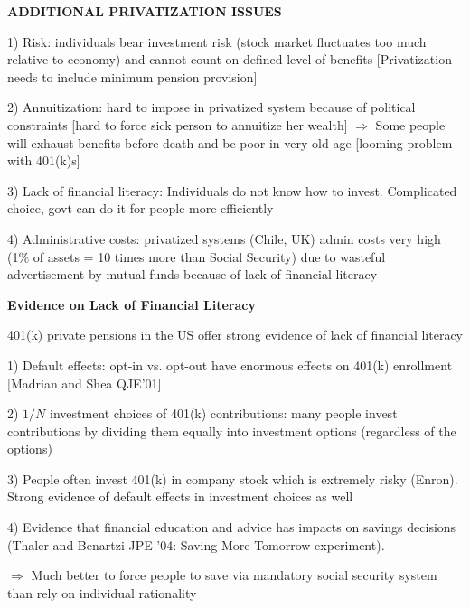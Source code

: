 \documentclass[landscape]{slides}
\begin{document}
\begin{slide}
\begin{center}
{\bf ADDITIONAL PRIVATIZATION ISSUES}
\end{center}

1) Risk: individuals bear investment risk (stock market fluctuates
too much relative to economy) and cannot count on defined level of benefits
[Privatization needs to include minimum pension provision]

2) Annuitization: hard to impose in privatized system because of
political constraints [hard to force sick person to annuitize her wealth]
$\Rightarrow$ Some people will exhaust benefits before death and
be poor in very old age [looming problem with 401(k)s]

3) Lack of financial literacy: Individuals do not know how to
invest. Complicated choice, govt
can do it for people more efficiently

4) Administrative costs: privatized systems (Chile, UK) admin
costs very high (1\% of assets = 10 times more than Social Security) due to wasteful advertisement
by mutual funds because of lack of financial literacy

\end{slide}


\begin{slide}
\begin{center}
{\bf Evidence on Lack of Financial Literacy }
\end{center}
401(k) private pensions in the US offer strong evidence of lack of financial literacy

\small

1) Default effects: opt-in vs. opt-out have enormous effects on 401(k) enrollment
[Madrian and Shea QJE'01] %

2) $1/N$ investment choices of 401(k) contributions: many people invest contributions
by dividing them equally into investment options (regardless of the options)

3) People often invest 401(k) in company stock which is extremely risky (Enron).
Strong evidence of default effects in investment choices as well

4) Evidence that financial education and advice has impacts on savings decisions
(Thaler and Benartzi JPE '04: Saving More Tomorrow experiment).

\normalsize
$\Rightarrow$ Much better to force people to save via mandatory social security system
than rely on individual rationality

\end{slide}
\end{document}
